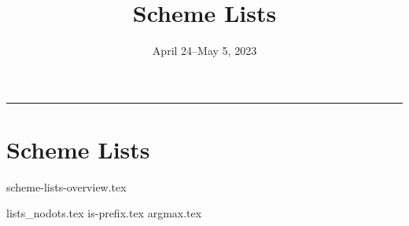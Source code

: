 \documentclass{exam}
\title{Scheme Lists}
\date{April 24--May 5, 2023}
\begin{document}
\maketitle\rule{\textwidth}{0.15em}


\section{Scheme Lists}
{scheme-lists-overview.tex}
\newpage
\begin{questions}
{lists_nodots.tex}
{is-prefix.tex}
{argmax.tex}

\end{questions}
\end{document}
